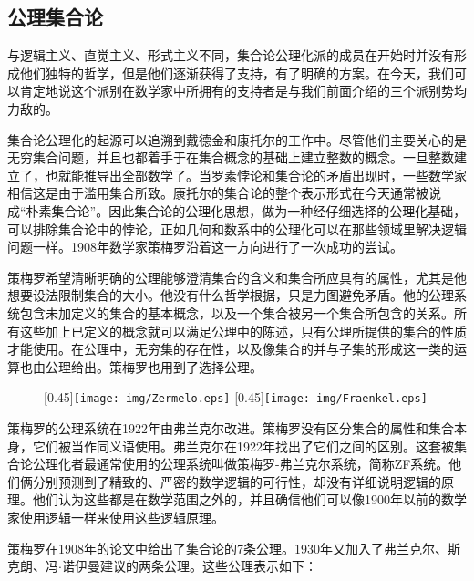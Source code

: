 \documentclass{article}
\begin{document}
\subsection{公理集合论}

与逻辑主义、直觉主义、形式主义不同，集合论公理化派的成员在开始时并没有形成他们独特的哲学，但是他们逐渐获得了支持，有了明确的方案。在今天，我们可以肯定地说这个派别在数学家中所拥有的支持者是与我们前面介绍的三个派别势均力敌的。

集合论公理化的起源可以追溯到戴德金和康托尔的工作中。尽管他们主要关心的是无穷集合问题，并且也都着手于在集合概念的基础上建立整数的概念。一旦整数建立了，也就能推导出全部数学了。当罗素悖论和集合论的矛盾出现时，一些数学家相信这是由于滥用集合所致。康托尔的集合论的整个表示形式在今天通常被说成“朴素集合论”。因此集合论的公理化思想，做为一种经仔细选择的公理化基础，可以排除集合论中的悖论，正如几何和数系中的公理化可以在那些领域里解决逻辑问题一样。1908年数学家策梅罗沿着这一方向进行了一次成功的尝试。

策梅罗希望清晰明确的公理能够澄清集合的含义和集合所应具有的属性，尤其是他想要设法限制集合的大小。他没有什么哲学根据，只是力图避免矛盾。他的公理系统包含未加定义的集合的基本概念，以及一个集合被另一个集合所包含的关系。所有这些加上已定义的概念就可以满足公理中的陈述，只有公理所提供的集合的性质才能使用。在公理中，无穷集的存在性，以及像集合的并与子集的形成这一类的运算也由公理给出。策梅罗也用到了选择公理。

\begin{figure}[htbp]
  \centering
  [0.45\linewidth]{\texttt{[image: img/Zermelo.eps]}} \quad
  [0.45\linewidth]{\texttt{[image: img/Fraenkel.eps]}}
  \captionsetup{labelformat=empty}
  \caption{}
  \label{fig:Zermelo-and-Fraenkel}
\end{figure}

 
策梅罗的公理系统在1922年由弗兰克尔改进。策梅罗没有区分集合的属性和集合本身，它们被当作同义语使用。弗兰克尔在1922年找出了它们之间的区别。这套被集合论公理化者最通常使用的公理系统叫做策梅罗-弗兰克尔系统，简称ZF系统。他们俩分别预测到了精致的、严密的数学逻辑的可行性，却没有详细说明逻辑的原理。他们认为这些都是在数学范围之外的，并且确信他们可以像1900年以前的数学家使用逻辑一样来使用这些逻辑原理。

策梅罗在1908年的论文中给出了集合论的7条公理。1930年又加入了弗兰克尔、斯克朗、冯$\cdot$诺伊曼建议的两条公理。这些公理表示如下：
\end{document}

